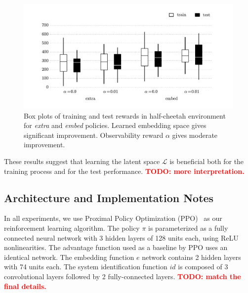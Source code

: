 \documentclass{article}
\newcommand{\TODO}[1]{\textcolor{red}{\textbf{TODO: #1}}}
\newcommand{\cL}{\mathcal{L}}
\newcommand{\extra}{\emph{extra}}
\newcommand{\embed}{\emph{embed}}
\newcommand{\embedfn}{e}
\newcommand{\idfn}{id}
\newcommand{\latent}{\cL}
\begin{document}
\begin{figure}[h]
\centering
\includegraphics[width=\textwidth]{halfcheetah_rewards.pdf}
\caption{
Box plots of training and test rewards in half-cheetah environment for \extra{} and \embed{} policies.
Learned embedding space gives significant improvement.
Observability reward $\alpha$ gives moderate improvement.
}
\label{cheetah-boxplot}
\end{figure}

These results suggest that learning the latent space $\latent$ is beneficial
both for the training process and for the test performance.
\TODO{more interpretation.}


\subsection{Architecture and Implementation Notes}
\label{implementation}
In all experiments, we use Proximal Policy Optimization (PPO)~\citep{schulman-ppo} as our reinforcement learning algorithm.
The policy $\pi$ is parameterized as a fully connected neural network with 3 hidden layers of 128 units each, using ReLU nonlinearities.
The advantage function used as a baseline by PPO uses an identical network.
The embedding function $\embedfn$ network contains 2 hidden layers with 74 units each.
The system identification function $\idfn$ is composed of 3 convolutional layers followed by 2 fully-connected layers.
\TODO{match the final details.}
\end{document}
